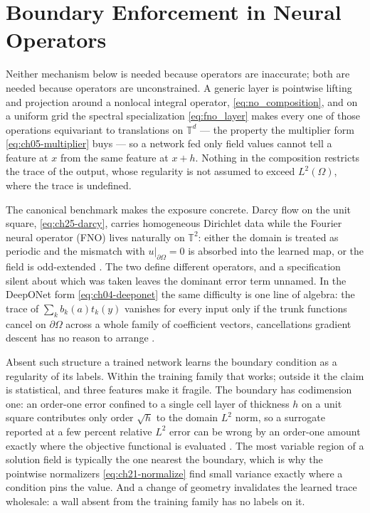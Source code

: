 \section{Boundary Enforcement in Neural Operators}
\label{sec:ch37-operator}

Neither mechanism below is needed because operators are inaccurate; both are needed because
operators are unconstrained. A generic layer is pointwise lifting and projection around a nonlocal
integral operator, \eqref{eq:no_composition}, and on a uniform grid the spectral specialization
\eqref{eq:fno_layer} makes every one of those operations equivariant to translations on
$\mathbb{T}^d$ --- the property the multiplier form \eqref{eq:ch05-multiplier} buys --- so a network fed
only field values cannot tell a feature at $x$ from the same feature at $x+h$. Nothing in the
composition restricts the trace of the output, whose regularity is not assumed to exceed $L^2(\Omega)$,
where the trace is undefined.

The canonical benchmark makes the exposure concrete. Darcy flow on the unit square,
\eqref{eq:ch25-darcy}, carries homogeneous Dirichlet data while the Fourier neural operator (FNO)
lives naturally on $\mathbb{T}^2$: either the domain is treated as periodic and the mismatch with
$u|_{\partial\Omega}=0$ is absorbed into the learned map, or the field is odd-extended
.
The two define different operators, and a specification silent about which was taken leaves the
dominant error term unnamed. In the DeepONet form \eqref{eq:ch04-deeponet} the same difficulty is one
line of algebra: the trace of $\sum_k b_k(a)t_k(y)$ vanishes for every input only if the trunk
functions cancel on $\partial\Omega$ across a whole family of coefficient vectors, cancellations
gradient descent has no reason to arrange
.

Absent such structure a trained network learns the boundary condition as a regularity of its labels.
Within the training family that works; outside it the claim is statistical, and three features make it
fragile. The boundary has codimension one: an order-one error confined to a single cell layer of
thickness $h$ on a unit square contributes only order $\sqrt{h}$ to the domain $L^2$ norm, so a
surrogate reported at a few percent relative $L^2$ error can be wrong by an order-one amount exactly
where the objective functional is evaluated
. The most variable region of a solution field is
typically the one nearest the boundary, which is why the pointwise normalizers \eqref{eq:ch21-normalize}
find small variance exactly where a condition pins the value. And a change of geometry invalidates the
learned trace wholesale: a wall absent from the training family has no labels on it.

